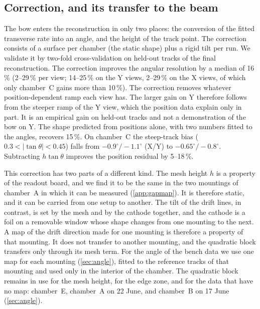 \subsection{Correction, and its transfer to the beam}\label{sec:bowcorr}
The bow enters the reconstruction in only two places: the conversion of the fitted transverse rate into an angle, and
the height of the track point. The correction consists of a surface per chamber (the static shape) plus a rigid tilt
per run. We validate it by two-fold cross-validation on held-out tracks of the final reconstruction. The correction
improves the angular resolution by a median of 16\,\% (2--29\,\% per view; 14--25\,\% on the Y views, 2--29\,\% on the
X views, of which only chamber~C gains more than 10\,\%). The correction removes whatever position-dependent ramp each
view has. The larger gain on Y therefore follows from the steeper ramp of the Y view, which the position data explain
only in part. It is an empirical gain on held-out tracks and not a demonstration of the bow on Y. The shape predicted
from positions alone, with two numbers fitted to the angles, recovers 15\,\%. On chamber~C the steep-track bias
($0.3<|\tan\theta|<0.45$) falls from $-0.9^\circ/-1.1^\circ$ (X/Y) to $-0.65^\circ/-0.8^\circ$. Subtracting
$h\tan\theta$ improves the position residual by 5--18\,\%.

This correction has two parts of a different kind. The mesh height $h$ is a property of the readout board, and we find
it to be the same in the two mountings of chamber~A in which it can be measured (\cref{app:gapmap}). It is therefore
static, and it can be carried from one setup to another. The tilt of the drift lines, in contrast, is set by the mesh
and by the cathode together, and the cathode is a foil on a removable window whose shape changes from one mounting to
the next. A map of the drift direction made for one mounting is therefore a property of that mounting. It does not
transfer to another mounting, and the quadratic block transfers only through its mesh term. For the angle of the bench
data we use one map for each mounting (\cref{sec:angle}), fitted to the reference tracks of that mounting and used
only in the interior of the chamber. The quadratic block remains in use for the mesh height, for the edge zone, and
for the data that have no map: chamber~E, chamber~A on 22 June, and chamber~B on 17 June (\cref{sec:angle}).

